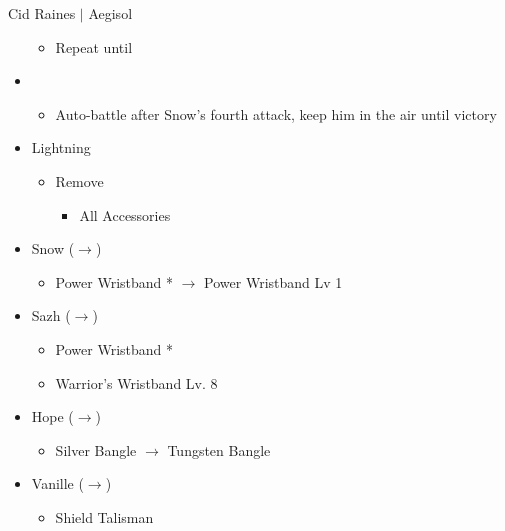 \begin{battle}{Cid Raines $|$ Aegisol}
\begin{multicols}{2}
\begin{itemize}
    \begin{itemize}
        \item Repeat until \stagger
    \end{itemize}
    \item \sixth
    \begin{itemize}
        \item Auto-battle after Snow's fourth attack, keep him in the air until victory
    \end{itemize}
\end{itemize}
\end{multicols}
\end{battle}

\begin{menu}
\begin{multicols}{2}
\begin{itemize}
    \equip
    \begin{itemize}
        \item Lightning
        \begin{itemize}
            \item Remove
            \begin{itemize}
                \item All Accessories
            \end{itemize}
        \end{itemize}
        \item Snow ($\rightarrow$)
            \begin{itemize}
                \item Power Wristband * $\rightarrow$ Power Wristband Lv 1
            \end{itemize}
        \item Sazh ($\rightarrow$)
        \begin{itemize}
                \item Power Wristband *
                \item Warrior's Wristband Lv. 8
            \end{itemize}
        \columnbreak
        \item Hope ($\rightarrow$)
            \begin{itemize}
                \item Silver Bangle $\rightarrow$ Tungsten Bangle
            \end{itemize}
        \item Vanille ($\rightarrow$)
        \begin{itemize}
                \item Shield Talisman

\end{itemize}
\end{itemize}
\end{itemize}
\end{multicols}
\end{menu}
